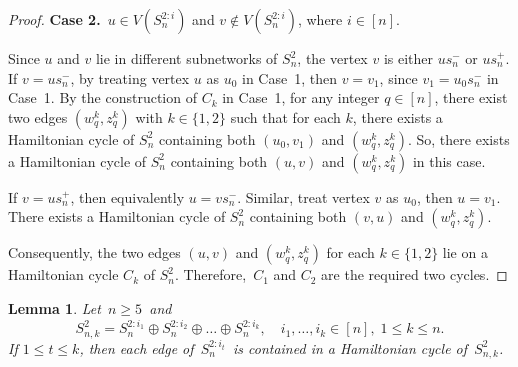 \documentclass[12pt,a4paper]{amsart}
\newtheorem{lemma}[thm]{Lemma}
\theoremstyle{definition}
\begin{document}
\begin{proof}
\textbf{Case 2.}~$u \in V(S_n^{2:i})$ and $v\notin V(S_n^{2:i})$, where $i \in [n]$.


Since $u$ and $v$ lie in different subnetworks of $S_n^2$, the vertex $v$ is either $us_n^{-}$ or $us_n^{+}$.
If $v = us_n^{-}$, by treating vertex $u$ as $u_0$ in Case~1, then $v=v_1$, since $v_1=u_0s_n^{-}$ in Case~1. By the construction of $C_k$ in Case~1, for any integer $q \in [n]$, there exist two edges $(w_q^k, z_q^k)$ with $k \in \{1,2\}$ such that for each $k$, there exists a Hamiltonian cycle of $S_n^2$ containing both $(u_0, v_1)$ and $(w_q^k, z_q^k)$. So, there exists a Hamiltonian cycle of $S_n^2$ containing both $(u,v)$ and $(w_q^k, z_q^k)$ in this case.


If $v = u s_n^{+}$, then equivalently $u = v s_n^{-}$. Similar, treat vertex $v$ as $u_0$, then $u=v_1$. There exists a Hamiltonian cycle of $S_n^2$ containing both $(v,u)$ and $(w_q^k, z_q^k)$.

Consequently, the two edges $(u,v)$ and $(w_q^k, z_q^k)$ for each $k \in \{1,2\}$ lie on a Hamiltonian cycle $C_k$ of $S_n^2$. Therefore,~$C_1$ and $C_2$ are the required two cycles.
    \end{proof}
	



	
	\begin{lemma}\label{11}
		Let~$n\ge5$~and
		\[
		S_{n,k}^2=S_n^{2:i_1}\oplus S_n^{2:i_2}\oplus\dots\oplus S_n^{2:i_k},\quad i_1,\dots,i_k\in[n],\;1\le k\le n.
		\]
		If $1\le t\le k$, then each edge of~$S_n^{2:i_t}$~is contained in a Hamiltonian cycle of~$S_{n,k}^2$.
	\end{lemma}
\end{document}
